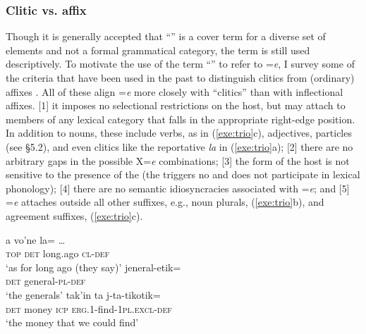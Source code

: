 \documentclass[output=paper,
modfonts
]{LSP/langsci}
\begin{document}
\subsubsection{Clitic vs. affix}
 Though it is generally accepted that ``'' is a cover term for a diverse set of elements and not a formal grammatical category, 
the term is still used descriptively. To motivate the use of the term ``'' to refer to  =\emph{e}, I 
survey some of the criteria that have been used in the past to  distinguish clitics from (ordinary) affixes \citep{zwickypullum1983}.  
All of these align =\emph{e} more closely with ``clitics'' than with inflectional affixes. 
[1]  it imposes no selectional restrictions on the host, but may attach to members of any lexical category that falls in the appropriate right-edge position. In addition to nouns, these include verbs, as in (\ref{exe:trio}c), adjectives, particles (see \S5.2), and even  clitics like the reportative  \emph{la} in (\ref{exe:trio}a); [2] there are no arbitrary gaps in the possible X=\emph{e} combinations; [3] the form of the host is not sensitive to the presence of the  (the  triggers no  and does not participate in lexical phonology); [4] there are no semantic idiosyncracies associated with =\emph{e}; and [5] =\emph{e} attaches outside all other suffixes, e.g., noun plurals,  (\ref{exe:trio}b), and agreement suffixes, (\ref{exe:trio}c).
\begin{exe}
\ex\label{exe:trio}
\begin{xlist}
\bridgeoverex
{}
\gll a  vo'ne la= \dots \\
 \textsc{top} \textsc{det} long.ago \textsc{cl-def} \\
 \glt  `as for long ago (they say)'
\bridgeoverex
{}
\gll {} jeneral-etik= \\
\textsc{det} general-\textsc{pl-def} \\
 \glt  `the generals'
\bridgeoverex
{}
\gll  {} tak'in ta j-ta-tikotik= \\
 \textsc{det} money \textsc{icp} \textsc{erg.1}-find-\textsc{1pl.excl-def} \\
 \glt `the  money that we could find'
\end{xlist}
\end{exe}
\end{document}
